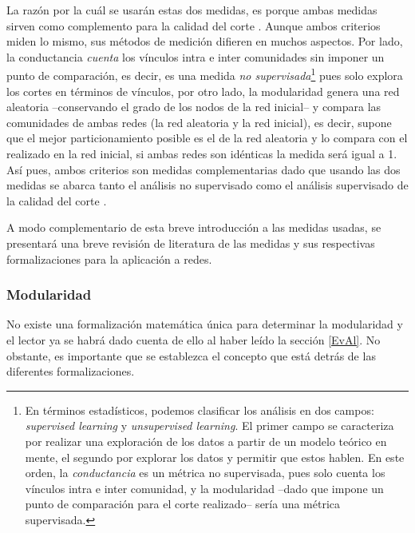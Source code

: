 \documentclass[12pt,letter]{article}
\begin{document}
La razón por la cuál se usarán estas dos medidas, es porque ambas medidas sirven como complemento para la calidad del corte  \citep{Gleich}. %
Aunque ambos criterios miden lo mismo, sus métodos de medición difieren en muchos aspectos. Por lado, la conductancia \emph{cuenta} los vínculos intra e inter comunidades sin imponer un punto de comparación, es decir, es una medida \emph{no supervisada}\footnote{En términos estadísticos, podemos clasificar los análisis en dos campos: \emph{supervised learning} y \emph{unsupervised learning}. El primer campo se caracteriza por realizar una exploración de los datos a partir de un modelo teórico en mente, el segundo por explorar los datos y permitir que estos hablen. En este orden, la \emph{conductancia} es un métrica no supervisada, pues solo cuenta los vínculos intra e inter comunidad, y la modularidad --dado que impone un punto de comparación para el corte realizado-- sería una métrica supervisada.} pues solo explora los cortes en términos de vínculos, por otro lado, la modularidad genera una red aleatoria --conservando el grado de los nodos de la red inicial-- y compara las comunidades de ambas redes (la red aleatoria y la red inicial), es decir, supone que el mejor particionamiento posible es el de la red aleatoria y lo compara con el realizado en la red inicial, si ambas redes son idénticas la medida será igual a 1. Así pues, ambos criterios son medidas complementarias dado que usando las dos medidas se abarca tanto el análisis no supervisado como el análisis supervisado de la calidad del corte \citep{Yang}. 

\vspace{0.5cm}

A modo complementario de esta breve introducción a las medidas usadas, se presentará una breve revisión de literatura de las medidas y sus respectivas formalizaciones para la aplicación a redes.

\subsubsection{Modularidad}

No existe una formalización matemática única para determinar la modularidad \citep{Newman4} y el lector ya se habrá dado cuenta de ello al haber leído la sección \ref{EvAl}. No obstante, es importante que se establezca el concepto que está detrás de las diferentes formalizaciones.
\end{document}
